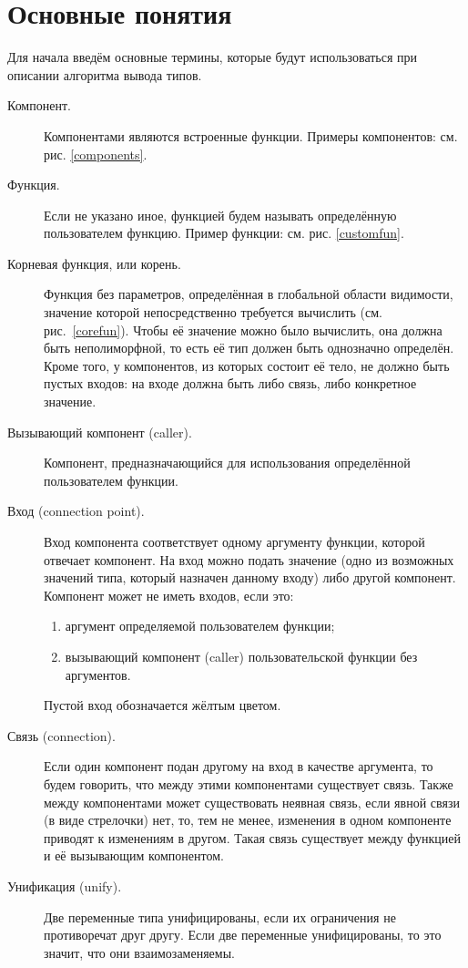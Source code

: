 \section{Основные понятия}
Для начала введём основные термины, которые будут использоваться при описании алгоритма вывода типов.
\begin{description}
	\item[Компонент.] Компонентами являются встроенные функции. Примеры компонентов: см. рис. \ref{components}.
	\item[Функция.] Если не указано иное, функцией будем называть определённую пользователем функцию. Пример функции: см. рис. \ref{customfun}.
	\item[Корневая функция, или корень.] Функция без параметров, определённая в глобальной области видимости, значение которой непосредственно требуется вычислить (см. рис.~\ref{corefun}). Чтобы её значение можно было вычислить, она должна быть неполиморфной, то есть её тип должен быть однозначно определён. Кроме того, у компонентов, из которых состоит её тело, не должно быть пустых входов: на входе должна быть либо связь, либо конкретное значение.
	\item[Вызывающий компонент (caller).] Компонент, предназначающийся для использования определённой пользователем функции.
	\item[Вход (connection point).] Вход компонента соответствует одному аргументу функции, которой отвечает компонент. На вход можно подать значение (одно из возможных значений типа, который назначен данному входу) либо другой компонент. Компонент может не иметь входов, если это: 
	\begin{enumerate}[1)]
		\item аргумент определяемой пользователем функции;
		\item вызывающий компонент (caller) пользовательской функции без аргументов.
	\end{enumerate} 
	Пустой вход обозначается жёлтым цветом.
	\item[Связь (connection).] Если один компонент подан другому на вход в качестве аргумента, то будем говорить, что между этими компонентами существует связь. Также между компонентами может существовать неявная связь, если явной связи (в виде стрелочки) нет, то, тем не менее, изменения в одном компоненте приводят к изменениям в другом. Такая связь существует между функцией и её вызывающим компонентом.
	\item[Унификация (unify).] Две переменные типа унифицированы, если их ограничения не противоречат друг другу. Если две переменные унифицированы, то это значит, что они взаимозаменяемы.

\end{description}
